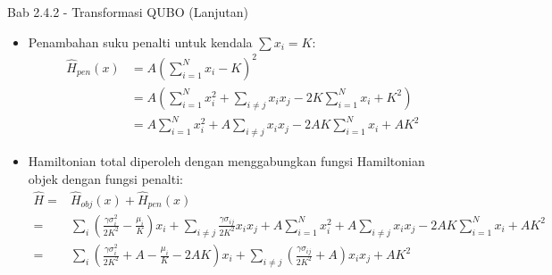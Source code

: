 \begin{frame}{Bab 2.4.2 - Transformasi QUBO (Lanjutan)}
    \begin{itemize}
        \item Penambahan suku penalti untuk kendala $\sum x_i = K$:
        {\tiny
        \begin{equation}
            \begin{split}
            \hat{H}_{pen}(x) &= A\left(\sum_{i=1}^N x_i - K\right)^2 \\
            &= A\left(\sum_{i=1}^N x_i^2 + \sum_{i\ne j} x_ix_j - 2K\sum_{i=1}^N x_i + K^2\right) \\
            &= A\sum_{i=1}^N x_i^2 + A\sum_{i\ne j} x_ix_j - 2AK\sum_{i=1}^N x_i + AK^2
            \end{split}
        \end{equation}
        }
        \item Hamiltonian total diperoleh dengan menggabungkan fungsi Hamiltonian objek dengan fungsi penalti:
        {\tiny
        \begin{equation}
            \begin{split}
                \hat{H} =& \hat{H}_{obj} (x) + \hat{H}_{pen} (x) \\
                =& \sum_i \left(\frac{\gamma \sigma_i^2}{2K^2} - \frac{\mu_i}{K}\right)x_i + \sum_{i\ne j}\frac{\gamma \sigma_{ij}}{2K^2} x_ix_j  + A\sum_{i=1}^N x_i^2 + A\sum_{i\ne j} x_ix_j - 2AK\sum_{i=1}^N x_i + AK^2 \\
                =& \sum_i \left(\frac{\gamma \sigma_i^2}{2K^2} + A - \frac{\mu_i}{K} - 2AK\right)x_i + \sum_{i\ne j}\left(\frac{\gamma \sigma_{ij}}{2K^2} + A\right) x_ix_j + AK^2
            \end{split}
        \end{equation}
        }
    \end{itemize}
\end{frame}

